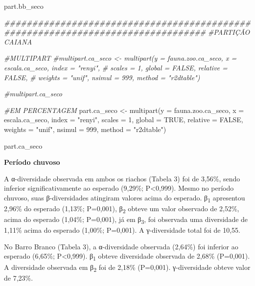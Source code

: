 \documentclass[
  letterpaper,
  DIV=11,
  numbers=noendperiod]{scrartcl}
\newenvironment{Shaded}{}{}
\newcommand{\AttributeTok}[1]{\textcolor[rgb]{0.49,0.56,0.16}{#1}}
\newcommand{\CommentTok}[1]{\textcolor[rgb]{0.38,0.63,0.69}{\textit{#1}}}
\newcommand{\ConstantTok}[1]{\textcolor[rgb]{0.53,0.00,0.00}{#1}}
\newcommand{\DecValTok}[1]{\textcolor[rgb]{0.25,0.63,0.44}{#1}}
\newcommand{\DocumentationTok}[1]{\textcolor[rgb]{0.73,0.13,0.13}{\textit{#1}}}
\newcommand{\FunctionTok}[1]{\textcolor[rgb]{0.02,0.16,0.49}{#1}}
\newcommand{\NormalTok}[1]{#1}
\newcommand{\OtherTok}[1]{\textcolor[rgb]{0.00,0.44,0.13}{#1}}
\newcommand{\StringTok}[1]{\textcolor[rgb]{0.25,0.44,0.63}{#1}}
\begin{document}
\begin{Shaded}
\begin{Highlighting}[numbers=left,,]
\NormalTok{part.bb\_seco}

\DocumentationTok{\#\#\#\#\#\#\#\#\#\#\#\#\#\#\#\#\#\#\#\#\#\#\#\#\#\#\#\#\#\#\#\#\#\#\#\#\#\#\#\#\#\#\#\#\#\#\#\#\#\#\#\#\#\#\#\#\#\#\#\#\#\#\#\#\#\#\#\#\#\#\#\#\#\#\#\#\#\#\#\#}
\CommentTok{\#PARTIÇÃO CAIANA}

\CommentTok{\#MULTIPART}
\CommentTok{\#multipart.ca\_seco \textless{}{-} multipart(y = fauna.zoo.ca\_seco, x = escala.ca\_seco, index = "renyi",}
\CommentTok{\#                          scales = 1, global = FALSE, relative = FALSE,}
\CommentTok{\#                          weights = "unif", nsimul = 999, method = "r2dtable")}

\CommentTok{\#multipart.ca\_seco}


\CommentTok{\#EM PERCENTAGEM}
\NormalTok{part.ca\_seco }\OtherTok{\textless{}{-}} \FunctionTok{multipart}\NormalTok{(}\AttributeTok{y =}\NormalTok{ fauna.zoo.ca\_seco, }\AttributeTok{x =}\NormalTok{ escala.ca\_seco, }\AttributeTok{index =} \StringTok{"renyi"}\NormalTok{,}
                     \AttributeTok{scales =} \DecValTok{1}\NormalTok{, }\AttributeTok{global =} \ConstantTok{TRUE}\NormalTok{, }\AttributeTok{relative =} \ConstantTok{FALSE}\NormalTok{,}
                     \AttributeTok{weights =} \StringTok{"unif"}\NormalTok{, }\AttributeTok{nsimul =} \DecValTok{999}\NormalTok{, }\AttributeTok{method =} \StringTok{"r2dtable"}\NormalTok{)}

\NormalTok{part.ca\_seco}
\end{Highlighting}
\end{Shaded}

\textbf{Período chuvoso}

A α-diversidade observada em ambos os riachos (Tabela 3) foi de 3,56\%,
sendo inferior significativamente ao esperado (9,29\%; P\textless0,999).
Mesmo no período chuvoso, suas β-diversidades atingiram valores acima do
esperado. β\textsubscript{1} apresentou 2,96\% do esperado (1,13\%;
P=0,001), β\textsubscript{2} obteve um valor observado de 2,52\%, acima
do esperado (1,04\%; P=0,001), já em β\textsubscript{3}, foi observada
uma diversidade de 1,11\% acima do esperado (1,00\%; P=0,001). A
γ-diversidade total foi de 10,55.

No Barro Branco (Tabela 3), a α-diversidade observada (2,64\%) foi
inferior ao esperado (6,65\%; P\textless0,999). β\textsubscript{1}
obteve diversidade observada de 2,68\% (P=0,001). A diversidade
observada em β\textsubscript{2} foi de 2,18\% (P=0,001). γ-diversidade
obteve valor de 7,23\%.
\end{document}
